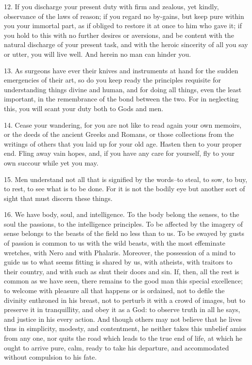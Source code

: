\documentclass{book}
\begin{document}
12. If you discharge your present duty with firm and zealous, yet
kindly, observance of the laws of reason; if you regard no by-gains,
but keep pure within you your immortal part, as if obliged to restore
it at once to him who gave it; if you hold to this with no further
desires or aversions, and be content with the natural discharge of
your present task, and with the heroic sincerity of all you say or
utter, you will live well. And herein no man can hinder you.

\newpage

13. As surgeons have ever their knives and instruments at hand for the
sudden emergencies of their art, so do you keep ready the principles
requisite for understanding things divine and human, and for doing all
things, even the least important, in the remembrance of the bond
between the two. For in neglecting this, you will scant your duty both
to Gods and men.

14. Cease your wandering, for you are not like to read again your own
memoirs, or the deeds of the ancient Greeks and Romans, or those
collections from the writings of others that you laid up for your old
age. Hasten then to your proper end. Fling away vain hopes, and, if
you have any care for yourself, fly to your own succour while yet you
may.

15. Men understand not all that is signified by the words--to steal,
to sow, to buy, to rest, to see what is to be done. For it is not the
bodily eye but another sort of sight that must discern these things.

16. We have body, soul, and intelligence. To the body belong the
senses, to the soul the passions, to the intelligence principles. To
be affected by the imagery of sense belongs to the beasts of the field
no less than to us. To be swayed by gusts of passion is common to us
with the wild beasts, with the most effeminate wretches, with Nero and
with Phalaris. Moreover, the possession of a mind to guide us to what
seems fitting is shared by us, with atheists, with traitors to their
country, and with such as shut their doors and sin. If, then, all the
rest is common as we have seen, there remains to the good man this
special excellence; to welcome with pleasure all that happens or is
ordained, not to defile the divinity enthroned in his breast, not to
perturb it with a crowd of images, but to preserve it in tranquillity,
and obey it as a God: to observe truth in all he says, and justice in
his every action. And though others may not believe that he lives thus
in simplicity, modesty, and contentment, he neither takes this
unbelief amiss from any one, nor quits the road which leads to the
true end of life, at which he ought to arrive pure, calm, ready to
take his departure, and accommodated without compulsion to his fate.
\end{document}
